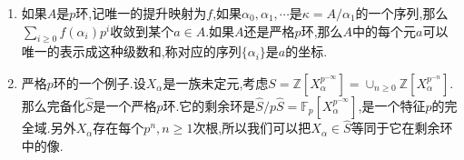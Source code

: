 \begin{enumerate}
\begin{enumerate}
    \end{enumerate}
    \item 如果$A$是$p$环,记唯一的提升映射为$f$,如果$\alpha_0,\alpha_1,\cdots$是$\kappa=A/\alpha_1$的一个序列,那么$\sum_{i\ge0}f(\alpha_i)p^i$收敛到某个$a\in A$.如果$A$还是严格$p$环,那么$A$中的每个元$a$可以唯一的表示成这种级数和,称对应的序列$\{\alpha_i\}$是$a$的坐标.
    \item 严格$p$环的一个例子.设$X_{\alpha}$是一族未定元,考虑$S=\mathbb{Z}[X_{\alpha}^{p^{-\infty}}]=\cup_{n\ge0}\mathbb{Z}[X_{\alpha}^{p^{-n}}]$.那么完备化$\widehat{S}$是一个严格$p$环.它的剩余环是$\widehat{S}/p\widehat{S}=\mathbb{F}_p[X_{\alpha}^{p^{-\infty}}]$,是一个特征$p$的完全域.另外$X_{\alpha}$存在每个$p^n,n\ge1$次根,所以我们可以把$X_{\alpha}\in\widehat{S}$等同于它在剩余环中的像.
\end{enumerate}

